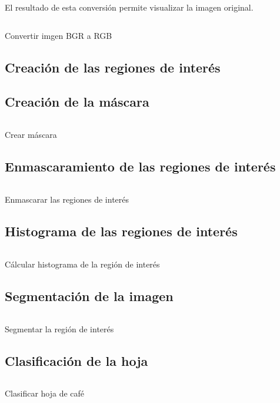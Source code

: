 El resultado de esta conversión permite visualizar la imagen original.

\begin{listing}[!ht]
\inputminted{python}{code_listings/bgr_to_rgb.py}
\caption{Convertir imgen BGR a RGB}
\label{code:bgr_to_rgb}
\end{listing}

\subsection{Creación de las regiones de interés}

\subsection{Creación de la máscara}
\begin{listing}[!ht]
\inputminted{python}{code_listings/mask.py}
\caption{Crear máscara}
\label{code:mask}
\end{listing}

\subsection{Enmascaramiento de las regiones de interés}
\begin{listing}[!ht]
\inputminted{python}{code_listings/masked_roi.py}
\caption{Enmascarar las regiones de interés}
\label{code:masked_roi}
\end{listing}

\subsection{Histograma de las regiones de interés}
\begin{listing}[!ht]
\inputminted{python}{code_listings/histogram.py}
\caption{Cálcular histograma de la región de interés}
\label{code:histogram}
\end{listing}

\subsection{Segmentación de la imagen}
\begin{listing}[!ht]
\inputminted{python}{code_listings/segmentation.py}
\caption{Segmentar la región de interés}
\label{code:segmentation}
\end{listing}

\subsection{Clasificación de la hoja}
\begin{listing}[!ht]
\inputminted{python}{code_listings/categorize.py}
\caption{Clasificar hoja de café}
\label{code:categorize}
\end{listing}

